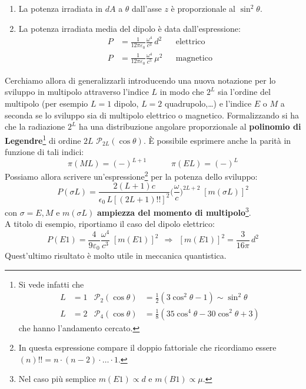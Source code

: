 \begin{enumerate}
    \item La potenza irradiata in $dA$ a $\theta$ dall'asse $z$ è proporzionale al $\sin^2{\theta}$.
    \item La potenza irradiata media del dipolo è data dall'espressione:
    \begin{displaymath}
    \begin{aligned}
    P&= \frac{1}{12\pi\varepsilon_0} \frac{\omega^4}{c^3} \, d^2 & &\text{elettrico} \\
    P&= \frac{1}{12\pi\varepsilon_0} \frac{\omega^4}{c^5} \, \mu^2 & &\text{magnetico} 
    \end{aligned}
    \end{displaymath}
\end{enumerate}
\noindent Cerchiamo allora di generalizzarli introducendo una nuova notazione per lo sviluppo in multipolo attraverso l'indice $L$ in modo che $2^L$ sia l'ordine del multipolo (per esempio $L=1$ dipolo, $L=2$ quadrupolo,\dots) e l'indice $E$ o $M$ a seconda se lo sviluppo sia di multipolo elettrico o magnetico. Formalizzando si ha che la radiazione $2^L$ ha una distribuzione angolare proporzionale al \textbf{polinomio di Legendre}\footnote{Si vede infatti che 
\begin{displaymath}
\begin{aligned}
L&=1 & \mathcal{P}_2(\cos{\theta})&= \frac{1}{2} (3\cos^2{\theta}-1)\sim\sin^2{\theta} \\
L&=2 & \mathcal{P}_4(\cos{\theta})&= \frac{1}{8} (35\cos^4{\theta}-30\cos^2{\theta}+3)
\end{aligned}
\end{displaymath}
che hanno l'andamento cercato.} di ordine $2L$ $\mathcal{P}_{2L}(\cos{\theta})$. È possibile esprimere anche la parità in funzione di tali indici:
$$\pi(ML)= (-)^{L+1} \qquad\quad \pi(EL)=(-)^L$$
Possiamo allora scrivere un'espressione\footnote{In questa espressione compare il doppio fattoriale che ricordiamo essere $(n)!! = n\cdot(n-2)\cdot\dots\cdot 1.$} per la potenza dello sviluppo:
$$P(\sigma L) = \frac{2(L+1)c}{\epsilon_0\,L[(2L+1)!!]^2} \bigl ( \frac{\omega}{c}\bigr)^{2L+2} \; [m(\sigma L)]^2 $$
con $\sigma = E,M$ e $m(\sigma L)$ \textbf{ampiezza del momento di multipolo}\footnote{Nel caso più semplice $m(E1) \propto d$ e $m(B1)\propto \mu$.}.\\
A titolo di esempio, riportiamo il caso del dipolo elettrico:
$$P(E1) = \frac{4}{9\varepsilon_0}\frac{\omega^4}{c^3}\;[m(E1)]^2 \;\,\Rightarrow\;\, [m(E1)]^2 = \frac{3}{16\pi}\,d^2$$
Quest'ultimo risultato è molto utile in meccanica quantistica.

